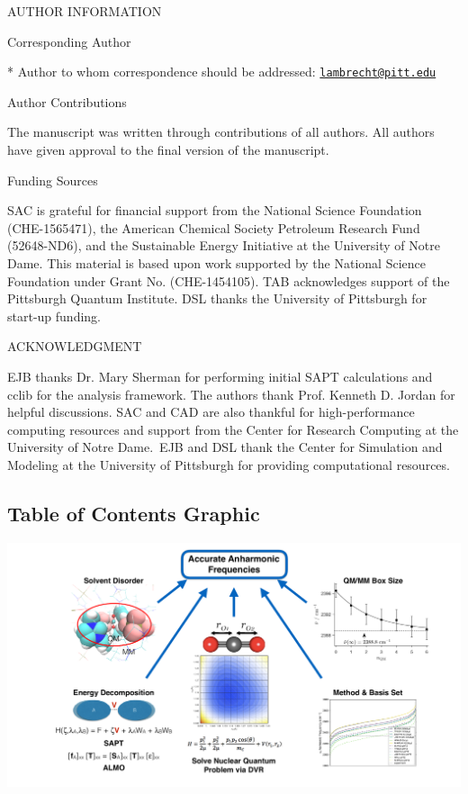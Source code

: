 AUTHOR INFORMATION

Corresponding Author

* Author to whom correspondence should be addressed: \href{mailto:lambrecht@pitt.edu}{\nolinkurl{lambrecht@pitt.edu}}

Author Contributions

The manuscript was written through contributions of all authors. All authors have given approval to the final version of the manuscript.

Funding Sources

SAC is grateful for financial support from the National Science Foundation (CHE-1565471), the American Chemical Society Petroleum Research Fund (52648-ND6), and the Sustainable Energy Initiative at the University of Notre Dame. This material is based upon work supported by the National Science Foundation under Grant No. (CHE-1454105). TAB acknowledges support of the Pittsburgh Quantum Institute. DSL thanks the University of Pittsburgh for start-up funding.

ACKNOWLEDGMENT

EJB thanks Dr. Mary Sherman for performing initial SAPT calculations and cclib\cite{OBoyle2008,Berquist2015} for the analysis framework. The authors thank Prof. Kenneth D. Jordan for helpful discussions. SAC and CAD are also thankful for high-performance computing resources and support from the Center for Research Computing at the University of Notre Dame.~EJB and DSL thank the Center for Simulation and Modeling at the University of Pittsburgh for providing computational resources.

\subsection{Table of Contents Graphic}
\label{table-of-contents-graphic}

\includegraphics[width=\textwidth]{paper_02/TOC.pdf}

